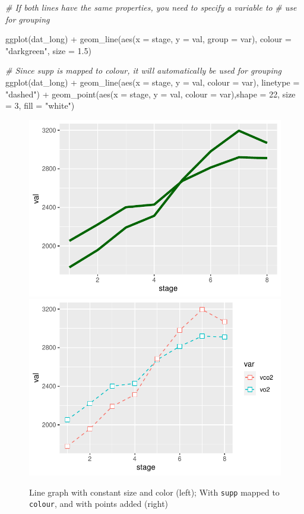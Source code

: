 \documentclass[
]{book}
\newenvironment{Shaded}{\begin{snugshade}}{\end{snugshade}}
\newcommand{\AttributeTok}[1]{\textcolor[rgb]{0.77,0.63,0.00}{#1}}
\newcommand{\CommentTok}[1]{\textcolor[rgb]{0.56,0.35,0.01}{\textit{#1}}}
\newcommand{\DecValTok}[1]{\textcolor[rgb]{0.00,0.00,0.81}{#1}}
\newcommand{\FloatTok}[1]{\textcolor[rgb]{0.00,0.00,0.81}{#1}}
\newcommand{\FunctionTok}[1]{\textcolor[rgb]{0.00,0.00,0.00}{#1}}
\newcommand{\NormalTok}[1]{#1}
\newcommand{\SpecialCharTok}[1]{\textcolor[rgb]{0.00,0.00,0.00}{#1}}
\newcommand{\StringTok}[1]{\textcolor[rgb]{0.31,0.60,0.02}{#1}}
\begin{document}
\begin{Shaded}
\begin{Highlighting}[]
\CommentTok{\# If both lines have the same properties, you need to specify a variable to}
\CommentTok{\# use for grouping}

\FunctionTok{ggplot}\NormalTok{(dat\_long) }\SpecialCharTok{+}
  \FunctionTok{geom\_line}\NormalTok{(}\FunctionTok{aes}\NormalTok{(}\AttributeTok{x =}\NormalTok{ stage, }\AttributeTok{y =}\NormalTok{ val, }\AttributeTok{group =}\NormalTok{ var),}
            \AttributeTok{colour =} \StringTok{"darkgreen"}\NormalTok{, }\AttributeTok{size =} \FloatTok{1.5}\NormalTok{) }

\CommentTok{\# Since supp is mapped to colour, it will automatically be used for grouping}
\FunctionTok{ggplot}\NormalTok{(dat\_long) }\SpecialCharTok{+}
  \FunctionTok{geom\_line}\NormalTok{(}\FunctionTok{aes}\NormalTok{(}\AttributeTok{x =}\NormalTok{ stage, }\AttributeTok{y =}\NormalTok{ val, }\AttributeTok{colour =}\NormalTok{ var), }\AttributeTok{linetype =} \StringTok{"dashed"}\NormalTok{) }\SpecialCharTok{+}  
  \FunctionTok{geom\_point}\NormalTok{(}\FunctionTok{aes}\NormalTok{(}\AttributeTok{x =}\NormalTok{ stage, }\AttributeTok{y =}\NormalTok{ val, }\AttributeTok{colour =}\NormalTok{ var),}\AttributeTok{shape =} \DecValTok{22}\NormalTok{, }\AttributeTok{size =} \DecValTok{3}\NormalTok{, }\AttributeTok{fill =} \StringTok{"white"}\NormalTok{)}
\end{Highlighting}
\end{Shaded}

\begin{figure}

{\centering \includegraphics[width=0.5\linewidth]{se201_stats_book_files/figure-latex/FIG-LINE-GRAPH-MULTI-LINE-CONSTANT-AES-1} \includegraphics[width=0.5\linewidth]{se201_stats_book_files/figure-latex/FIG-LINE-GRAPH-MULTI-LINE-CONSTANT-AES-2} 

}

\caption[Line graph with constant size and color (left); With \texttt{supp} mapped to \texttt{colour}, and with points added (right)]{Line graph with constant size and color (left); With \texttt{supp} mapped to \texttt{colour}, and with points added (right)}\label{fig:FIG-LINE-GRAPH-MULTI-LINE-CONSTANT-AES}
\end{figure}
\end{document}
